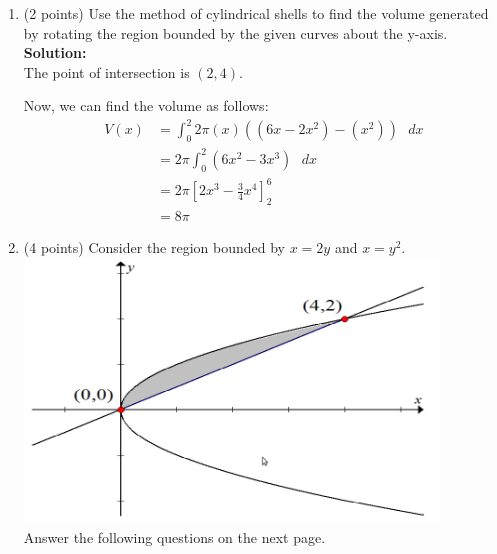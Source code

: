 \documentclass[paper=a4, fontsize=11pt]{scrartcl} %
\numberwithin{equation}{section} %
\numberwithin{figure}{section} %
\numberwithin{table}{section} %
\begin{document}
\begin{enumerate}
\item (2 points) Use the method of cylindrical shells to find the volume generated by rotating the region bounded by the given curves about the y-axis.\\

\noindent\textbf{Solution:}\\
The point of intersection is $(2,4)$.

Now, we can find the volume as follows:
\begin{align*}
V(x) &= \int_0^2 2 \pi (x) \left( (6x-2x^2)-(x^2) \right)  \text{  } dx \\
&= 2 \pi \int_0^2  \left( 6x^2-3x^3 \right)  \text{  } dx \\
&= 2 \pi \left[ 2x^3 - \frac{3}{4}x^4 \right]_2^6\\
&= \boxed{8 \pi}
\end{align*}
\newpage
\item (4 points) Consider the region bounded by $x=2y$ and $x=y^2$.\\
\includegraphics[width=11cm]{IC2_4}\\
Answer the following questions on the next page. 


\end{enumerate}
\end{document}
